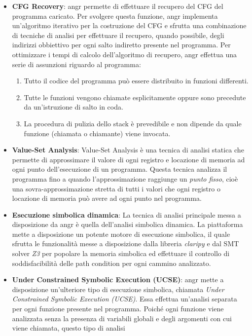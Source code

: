 \documentclass[../main.tex]{subfiles}
\begin{document}
\begin{itemize}
    \item \textbf{CFG Recovery}: angr permette di effettuare il recupero del CFG del programma caricato. Per svolgere questa funzione, angr implementa un'algoritmo iterativo per la costruzione del CFG e sfrutta una combinazione
    di tecniche di analisi per effettuare il recupero, quando possibile, degli indirizzi obbiettivo per ogni salto indiretto presente nel programma. Per ottimizzare i tempi di calcolo dell'algoritmo di recupero, angr effettua una serie di assunzioni riguardo
    al programma:
    \begin{enumerate}
        \item Tutto il codice del programma può essere distribuito in funzioni differenti.
        \item Tutte le funzioni vengono chiamate esplicitamente oppure sono precedute da un'istruzione di salto in coda.
        \item La procedura di pulizia dello stack è prevedibile e non dipende da quale funzione (chiamata o chiamante) viene invocata.
    \end{enumerate}
    \item \textbf{Value-Set Analysis}: Value-Set Analysis è una tecnica di analisi statica che permette di approssimare il valore di ogni registro e locazione di memoria ad ogni punto dell'esecuzione di un programma.
    Questa tecnica analizza il programma fino a quando l'approssimazione raggiunge un \textit{punto fisso}, cioè una sovra-approssimazione stretta di tutti i valori che ogni registro o locazione di memoria può avere ad ogni punto nel programma.
    \item \textbf{Esecuzione simbolica dinamica}: La tecnica di analisi principale messa a disposizione da angr è quella dell'analisi simbolica dinamica. La piattaforma mette a disposizione un potente motore di esecuzione simbolica, il quale sfrutta
    le funzionalità messe a disposizione dalla libreria \textit{claripy} e dal SMT solver \textit{Z3} per popolare la memoria simbolica ed effettuare il controllo di soddisfacibilità delle path condition per ogni cammino analizzato.
    \item \textbf{Under Constrained Symbolic Execution (UCSE)}: angr mette a disposizione un'ulteriore tipo di esecuzione simbolica, chiamata \textit{Under Constrained Symbolic Execution (UCSE)}. Essa effettua un'analisi separata per ogni funzione presente nel programma. Poiché ogni funzione viene analizzata senza la presenza di variabili globali e degli argomenti con cui viene chiamata, questo tipo di analisi

\end{itemize}
\end{document}
